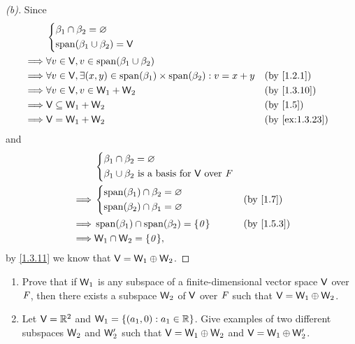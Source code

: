 \begin{proof}[(b)]
  Since
  \begin{align*}
             & \begin{dcases}
                 \beta_1 \cap \beta_2 = \varnothing \\
                 \spn{\beta_1 \cup \beta_2} = \V
               \end{dcases}                                                                      \\
    \implies & \forall v \in \V, v \in \spn{\beta_1 \cup \beta_2}                                                      \\
    \implies & \forall v \in \V, \exists (x, y) \in \spn{\beta_1} \times \spn{\beta_2} : v = x + y &  & \by{1.2.1}     \\
    \implies & \forall v \in \V, v \in \W_1 + \W_2                                                 &  & \by{1.3.10}    \\
    \implies & \V \subseteq \W_1 + \W_2                                                            &  & \by{1.5}       \\
    \implies & \V = \W_1 + \W_2                                                                    &  & \by{ex:1.3.23}
  \end{align*}
  and
  \begin{align*}
             & \begin{dcases}
                 \beta_1 \cap \beta_2 = \varnothing \\
                 \beta_1 \cup \beta_2 \text{ is a basis for } \V \text{ over } \F
               \end{dcases}                  \\
    \implies & \begin{dcases}
                 \spn{\beta_1} \cap \beta_2 = \varnothing \\
                 \spn{\beta_2} \cap \beta_1 = \varnothing
               \end{dcases}                      &  & \by{1.7}                                  \\
    \implies & \spn{\beta_1} \cap \spn{\beta_2} = \set{\zv}                     &  & \by{1.5.3} \\
    \implies & \W_1 \cap \W_2 = \set{\zv},
  \end{align*}
  by \cref{1.3.11} we know that \(\mathsf{V} = \mathsf{W}_1 \oplus \mathsf{W}_2\).
\end{proof}

\begin{ex}\label{ex:1.6.34}
  \quad
  \begin{enumerate}
    \item Prove that if \(\mathsf{W}_1\) is any subspace of a finite-dimensional vector space \(\mathsf{V}\) over \(\mathit{F}\), then there exists a subspace \(\mathsf{W}_2\) of \(\mathsf{V}\) over \(\mathit{F}\) such that \(\mathsf{V} = \mathsf{W}_1 \oplus \mathsf{W}_2\).
    \item Let \(\mathsf{V} = \mathbb{R}^2\) and \(\mathsf{W}_1 = \left\lbrace(a_1, 0) : a_1 \in \mathbb{R}\right\rbrace\).
          Give examples of two different subspaces \(\mathsf{W}_2\) and \(\mathsf{W}_2'\) such that \(\mathsf{V} = \mathsf{W}_1 \oplus \mathsf{W}_2\) and \(\mathsf{V} = \mathsf{W}_1 \oplus \mathsf{W}_2'\).
  \end{enumerate}
\end{ex}

